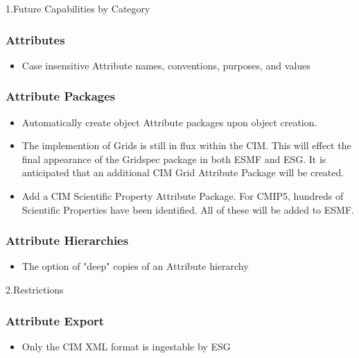 %

1.Future Capabilities by Category
 
\subsubsection{Attributes}

\begin{itemize}
\item Case insensitive Attribute names, conventions, purposes, and values
\end{itemize}


\subsubsection{Attribute Packages}

\begin{itemize}
\item Automatically create object Attribute packages upon object creation.
\item The implemention of Grids is still in flux within the CIM.  This will effect the final appearance of the Gridspec package in both ESMF and ESG. It is anticipated that an additional CIM Grid Attribute Package will be created.
\item Add a CIM Scientific Property Attribute Package. For CMIP5, hundreds of Scientific Properties have been identified. All of these will be added to ESMF.    
\end{itemize}

\subsubsection{Attribute Hierarchies}

\begin{itemize}
\item The option of "deep" copies of an Attribute hierarchy
\end{itemize}


2.Restrictions

\subsubsection{Attribute Export}
\begin{itemize}
\item Only the CIM XML format is ingestable by ESG
\end{itemize}


